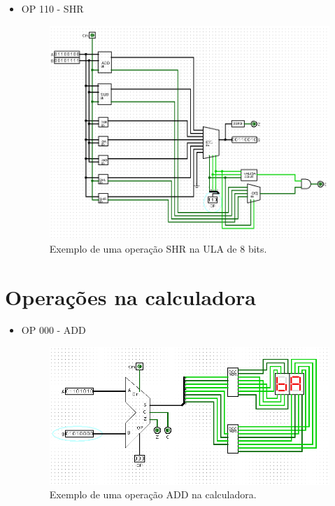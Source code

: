 \documentclass[
	12pt,				%
	openright,			%
	twoside,			%
	a4paper,			%
	english,			%
	french,				%
	spanish,			%
	brazil,				%
	]{abntex2}
\begin{document}
\begin{apendicesenv}
\begin{itemize}
\newpage
\item{OP 110 - SHR}

\begin{figure}[H]
	\begin{center}
	    \includegraphics[scale=0.5]{alu8110shr.png}
	\end{center}
\caption{\label{alu8110shr}Exemplo de uma operação SHR na ULA de 8 bits.}
\end{figure}

\end{itemize}


\newpage
\section{Operações na calculadora}

\begin{itemize}
\item {OP 000 - ADD}

\begin{figure}[H]
	\begin{center}
	    \includegraphics[scale=0.55]{calc000add.png}
	\end{center}
\caption{\label{calc000add}Exemplo de uma operação ADD na calculadora.}
\end{figure}


\end{itemize}
\end{apendicesenv}
\end{document}
